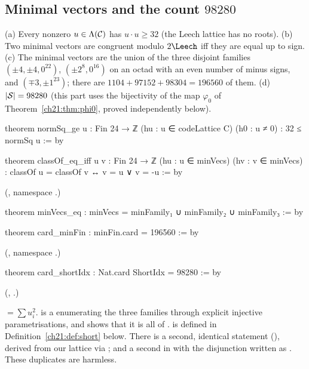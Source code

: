 \subsection{Minimal vectors and the count \texorpdfstring{$98280$}{98280}}

\begin{theorem}\label{ch21:thm:minvecs}
(a) Every nonzero $u\in\Lambda(\mathcal{C})$ has $u\cdot u\ge32$ (the Leech lattice has no roots).
(b) Two minimal vectors are congruent modulo $2\Leech$ iff they are equal up to sign.
(c) The minimal vectors are the union of the three disjoint families
$(\pm4,\pm4,0^{22})$, $(\pm2^8,0^{16})$ on an octad with an even number of minus signs, and
$(\mp3,\pm1^{23})$; there are $1104+97152+98304=196560$ of them.
(d) $|\mathcal{S}|=98280$ (this part uses the bijectivity of the map $\varphi_0$ of Theorem~\ref{ch21:thm:phi0}, proved independently below).
\end{theorem}
\begin{leancode}
theorem normSq_ge {u : Fin 24 → ℤ} (hu : u ∈ codeLattice C) (h0 : u ≠ 0) : 32 ≤ normSq u := by
\end{leancode}
\begin{leancode}
theorem classOf_eq_iff {u v : Fin 24 → ℤ} (hu : u ∈ minVecs) (hv : v ∈ minVecs) :
    classOf u = classOf v ↔ v = u ∨ v = -u := by
\end{leancode}
(, namespace .)
\begin{leancode}
theorem minVecs_eq : minVecs = minFamily₁ ∪ minFamily₂ ∪ minFamily₃ := by
\end{leancode}
\begin{leancode}
theorem card_minFin : minFin.card = 196560 := by
\end{leancode}
(, namespace .)
\begin{leancode}
theorem card_shortIdx : Nat.card ShortIdx = 98280 := by
\end{leancode}
(, .)
\begin{dictionary}
 $=\sum u_i^2$.   is a  enumerating the three families
through explicit injective parametrisations, and  shows that it is all of
.   is defined in Definition~\ref{ch21:def:short} below.  There is a
second, identical statement 
(), derived from our lattice via ; and a second
 in  with the disjunction written as .
These duplicates are harmless.
\end{dictionary}
